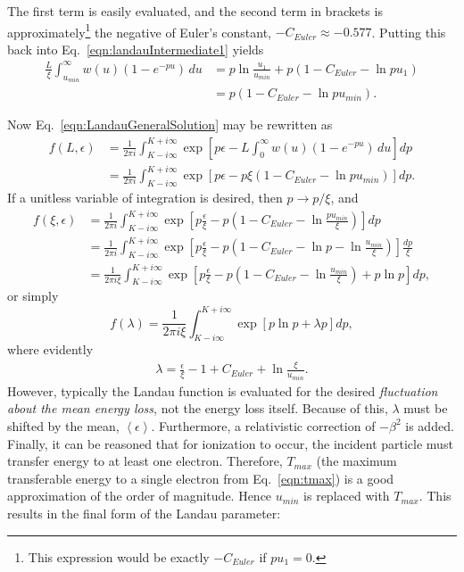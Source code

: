 The first term is easily evaluated, and the second term in brackets is approximately\footnote{This expression would be exactly $-C_{Euler}$ if $pu_1=0$.} the negative of Euler's constant, $-C_{Euler}\approx -0.577$. Putting this back into Eq.~\eqref{eqn:landauIntermediate1} yields
\begin{align*}
\frac{L}{\xi}\int_{u_{min}} ^\infty w(u)  (1-e^{-pu})\, du &=p \ln\frac{u_1}{u_{min}} + p(1-C_{Euler}-\ln pu_1)\\
&=p(1-C_{Euler}-\ln pu_{min}).
\end{align*}

Now Eq.~\eqref{eqn:LandauGeneralSolution} may be rewritten as
\begin{align*}
f(L,\epsilon)&=\frac{1}{2\pi i} \int_{K-i\infty} ^{K+i\infty} \exp\left[p\epsilon-L\int_0 ^\infty w(u)  (1-e^{-pu})\, du\right] dp\\
&= \frac{1}{2\pi i} \int_{K-i\infty} ^{K+i\infty} \exp\left[p\epsilon-p\xi(1-C_{Euler}-\ln pu_{min})\right] dp.
\end{align*}
If a unitless variable of integration is desired, then $p\rightarrow p/\xi$, and
\begin{align*}
f(\xi,\epsilon)&=\frac{1}{2\pi i} \int_{K-i\infty} ^{K+i\infty} \exp\left[p\frac{\epsilon}{\xi}-p\left(1-C_{Euler}-\ln \frac{pu_{min}}{\xi}\right)\right] dp\\
&=\frac{1}{2\pi i} \int_{K-i\infty} ^{K+i\infty} \exp\left[p\frac{\epsilon}{\xi}-p\left(1-C_{Euler}-\ln p - \ln\frac{ u_{min}}{\xi}\right)\right] \frac{dp}{\xi}\\
&=\frac{1}{2\pi i \xi} \int_{K-i\infty} ^{K+i\infty} \exp\left[p\frac{\epsilon}{\xi}-p\left(1-C_{Euler}-\ln \frac{u_{min}}{\xi}\right)+p\ln p\right] dp,
\end{align*}
or simply
\begin{equation}\label{eqn:landau_apx}
f(\lambda)=\frac{1}{2\pi i \xi} \int_{K-i\infty} ^{K+i\infty} \exp\left[p\ln p + \lambda p\right] dp,
\end{equation}
where evidently
\begin{align*}
\lambda = \frac{\epsilon}{\xi} -1+C_{Euler}+\ln \frac{\xi}{u_{min}}.
\end{align*}
However, typically the Landau function is evaluated for the desired \emph{fluctuation about the mean energy loss}, not the energy loss itself. Because of this, $\lambda$ must be shifted by the mean, $\left< \epsilon \right>$. Furthermore, a relativistic correction of $-\beta ^2$ is added. Finally, it can be reasoned that for ionization to occur, the incident particle must transfer energy to at least one electron. Therefore, $T_{max}$ (the maximum transferable energy to a single electron from Eq.~\eqref{eqn:tmax}) is a good approximation of the order of magnitude. Hence $u_{min}$ is replaced with $T_{max}$. This results in the final form of the Landau parameter:
